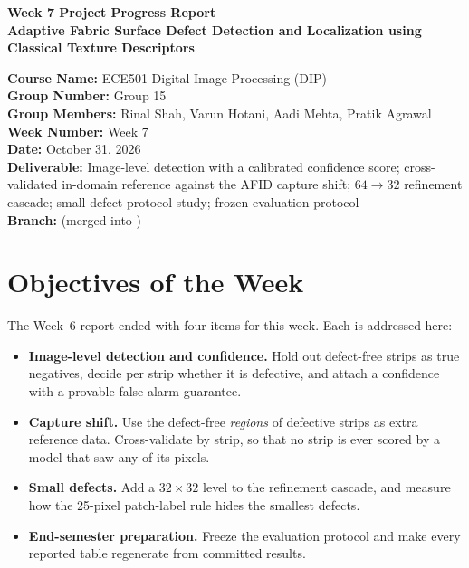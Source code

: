 \documentclass[11pt,a4paper]{article}
\newcommand{\code}[1]{\texttt{\detokenize{#1}}}
\begin{document}
\begin{center}
{\LARGE\bfseries Week 7 Project Progress Report}\\[4pt]
{\large\bfseries Adaptive Fabric Surface Defect Detection and Localization using\\ Classical Texture Descriptors}
\end{center}

\noindent
\textbf{Course Name:} ECE501 Digital Image Processing (DIP)\\
\textbf{Group Number:} Group 15\\
\textbf{Group Members:} Rinal Shah, Varun Hotani, Aadi Mehta, Pratik Agrawal\\
\textbf{Week Number:} Week 7\\
\textbf{Date:} October 31, 2026\\
\textbf{Deliverable:} Image-level detection with a calibrated confidence score; cross-validated in-domain reference against the AFID capture shift; $64\rightarrow32$ refinement cascade; small-defect protocol study; frozen evaluation protocol\\
\textbf{Branch:} \code{feat/week-7} (merged into \code{main})

\section*{Objectives of the Week}
The Week~6 report ended with four items for this week. Each is addressed here:
\begin{itemize}
  \item \textbf{Image-level detection and confidence.} Hold out defect-free strips as true negatives, decide per strip whether it is defective, and attach a confidence with a provable false-alarm guarantee.
  \item \textbf{Capture shift.} Use the defect-free \emph{regions} of defective strips as extra reference data. Cross-validate by strip, so that no strip is ever scored by a model that saw any of its pixels.
  \item \textbf{Small defects.} Add a $32\times32$ level to the refinement cascade, and measure how the 25-pixel patch-label rule hides the smallest defects.
  \item \textbf{End-semester preparation.} Freeze the evaluation protocol and make every reported table regenerate from committed results.
\end{itemize}
\end{document}
